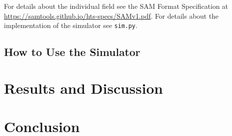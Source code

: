 \documentclass[10pt,a4paper]{article}
\begin{document}
For details about the individual field see the SAM Format Specification at \url{https://samtools.github.io/hts-specs/SAMv1.pdf}. For details about the implementation of the simulator see \texttt{sim.py}.

\subsection{How to Use the Simulator}

\section{Results and Discussion}

\section{Conclusion}


{}

\newpage
\appendix
\end{document}
